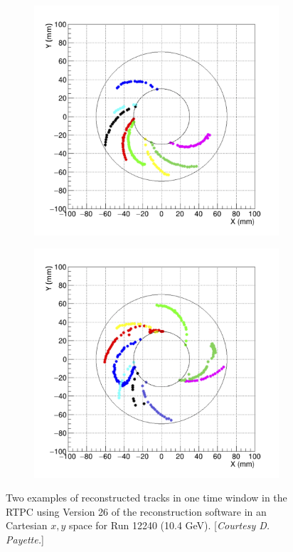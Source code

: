 \begin{figure}[h!]
	\centering
	\begin{subfigure}[b]{0.44\linewidth}
		\includegraphics[width=\linewidth]{figures/RTPC_tracks_12240_1.png}
	\end{subfigure}
	\begin{subfigure}[b]{0.44\textwidth}
		\includegraphics[width=\linewidth]{figures/RTPC_tracks_12240_2.png}
	\end{subfigure}
	\caption{Two examples of reconstructed tracks in one time window in the RTPC using Version 26 of the reconstruction software in an Cartesian $x,y$ space for Run 12240 (10.4 GeV). [\textit{Courtesy D. Payette.}]}
	\label{fig:rtpc_tracks_12240}
\end{figure}

